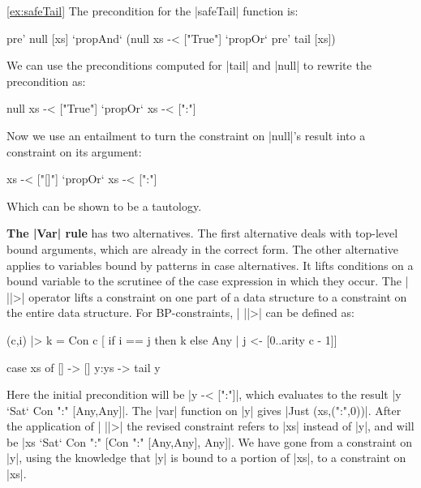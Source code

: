 \documentclass[preprint]{sigplanconf}
\newcommand{\para}[1]{\vspace{2mm}\noindent\textbf{#1}}
\begin{document}
\begin{examplerevisit}{\ref{ex:safeTail}}
The precondition for the |safeTail| function is:

\ignore\begin{code}
pre' null [xs] `propAnd` (null xs -< ["True"] `propOr` pre' tail [xs])
\end{code}

\noindent We can use the preconditions computed for |tail| and |null| to rewrite the precondition as:

\ignore\begin{code}
null xs -< ["True"] `propOr` xs -< [":"]
\end{code}

\noindent Now we use an entailment to turn the constraint on |null|'s result into a constraint on its argument:

\ignore\begin{code}
xs -< ["[]"] `propOr` xs -< [":"]
\end{code}

\noindent Which can be shown to be a tautology.
\end{examplerevisit}


\para{The |Var| rule} has two alternatives. The first alternative deals with top-level bound arguments, which are already in the correct form. The other alternative applies to variables bound by patterns in case alternatives. It lifts conditions on a bound variable to the scrutinee of the case expression in which they occur. The | ||>| operator lifts a constraint on one part of a data structure to a constraint on the entire data structure. For BP-constraints, | ||>| can be defined as:

\begin{code}
(c,i) |> k = Con c  [  if i == j then k else Any
                    |  j <- [0..arity c - 1]]
\end{code}

\begin{example}
\ignore\begin{code}
case  xs of
      []    -> []
      y:ys  -> tail y
\end{code}

Here the initial precondition will be |y -< [":"]|, which evaluates to the result |y `Sat` Con ":" [Any,Any]|. The |var| function on |y| gives |Just (xs,(":",0))|. After the application of | ||>| the revised constraint refers to |xs| instead of |y|, and will be |xs `Sat` Con ":" [Con ":" [Any,Any], Any]|. We have gone from a constraint on |y|, using the knowledge that |y| is bound to a portion of |xs|, to a constraint on |xs|.
\end{example}
\end{document}
